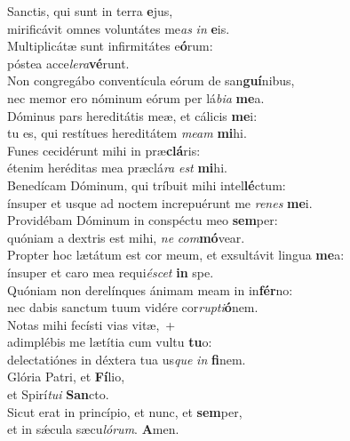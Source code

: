 \evenverse Sanctis, qui sunt in terra \textbf{e}jus,~\*\\
\evenverse mirificávit omnes voluntátes me\textit{as} \textit{in} \textbf{e}is.\\
\oddverse Multiplicátæ sunt infirmitátes e\textbf{ó}rum:~\*\\
\oddverse póstea acce\textit{le}\textit{ra}\textbf{vé}runt.\\
\evenverse Non congregábo conventícula eórum de san\textbf{guí}nibus,~\*\\
\evenverse nec memor ero nóminum eórum per lá\textit{bi}\textit{a} \textbf{me}a.\\
\oddverse Dóminus pars hereditátis meæ, et cálicis \textbf{me}i:~\*\\
\oddverse tu es, qui restítues hereditátem \textit{me}\textit{am} \textbf{mi}hi.\\
\evenverse Funes cecidérunt mihi in præ\textbf{clá}ris:~\*\\
\evenverse étenim heréditas mea præclá\textit{ra} \textit{est} \textbf{mi}hi.\\
\oddverse Benedícam Dóminum, qui tríbuit mihi intel\textbf{lé}ctum:~\*\\
\oddverse ínsuper et usque ad noctem increpuérunt me \textit{re}\textit{nes} \textbf{me}i.\\
\evenverse Providébam Dóminum in conspéctu meo \textbf{sem}per:~\*\\
\evenverse quóniam a dextris est mihi, \textit{ne} \textit{com}\textbf{mó}vear.\\
\oddverse Propter hoc lætátum est cor meum, et exsultávit lingua \textbf{me}a:~\*\\
\oddverse ínsuper et caro mea requi\textit{é}\textit{scet} \textbf{in} spe.\\
\evenverse Quóniam non derelínques ánimam meam in in\textbf{fér}no:~\*\\
\evenverse nec dabis sanctum tuum vidére cor\textit{rup}\textit{ti}\textbf{ó}nem.\\
\oddverse Notas mihi fecísti vias vitæ,~+\\
\oddverse  adimplébis me lætítia cum vultu \textbf{tu}o:~\*\\
\oddverse delectatiónes in déxtera tua us\textit{que} \textit{in} \textbf{fi}nem.\\
\evenverse Glória Patri, et \textbf{Fí}lio,~\*\\
\evenverse et Spirí\textit{tu}\textit{i} \textbf{San}cto.\\
\oddverse Sicut erat in princípio, et nunc, et \textbf{sem}per,~\*\\
\oddverse et in sǽcula sæcu\textit{ló}\textit{rum}. \textbf{A}men.\\
